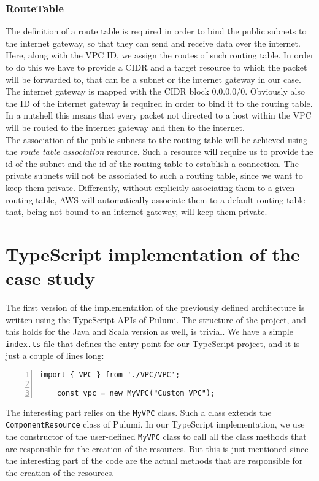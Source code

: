 \subsubsection{RouteTable}
\label{sssec:routetable}
The definition of a route table is required in order to bind the public subnets to the internet gateway, so that they can send and receive data over the internet.\\
Here, along with the VPC ID, we assign the routes of such routing table.
In order to do this we have to provide a CIDR and a target resource to which the packet will be forwarded to, that can be a subnet or the internet gateway in our case.
The internet gateway is mapped with the CIDR block 0.0.0.0/0.
Obviously also the ID of the internet gateway is required in order to bind it to the routing table.\\
In a nutshell this means that every packet not directed to a host within the VPC will be routed to the internet gateway and then to the internet.\\
The association of the public subnets to the routing table will be achieved using the \textit{route table association} resource.
Such a resource will require us to provide the id of the subnet and the id of the routing table to establish a connection.
The private subnets will not be associated to such a routing table, since we want to keep them private.
Differently, without explicitly associating them to a given routing table, AWS will automatically associate them to a default routing table that, being not bound to an internet gateway, will keep them private.\\


\section{TypeScript implementation of the case study}
\label{sec:typescript-impl}
The first version of the implementation of the previously defined architecture is written using the TypeScript APIs of Pulumi.
The structure of the project, and this holds for the Java and Scala version as well, is trivial.
We have a simple \texttt{index.ts} file that defines the entry point for our TypeScript project, and it is just a couple of lines long:\\
\begin{minipage}{\linewidth}
\begin{lstlisting}[numbers=left, numberstyle=\tiny, numbersep=-5pt, stepnumber=1]
    import { VPC } from './VPC/VPC';
  
    const vpc = new MyVPC("Custom VPC");
  \end{lstlisting}
\end{minipage}
The interesting part relies on the \texttt{MyVPC} class.
Such a class extends the \texttt{ComponentResource} class of Pulumi.
In our TypeScript implementation, we use the constructor of the user-defined \texttt{MyVPC} class to call all the class methods that are responsible for the creation of the resources.
But this is just mentioned since the interesting part of the code are the actual methods that are responsible for the creation of the resources.

